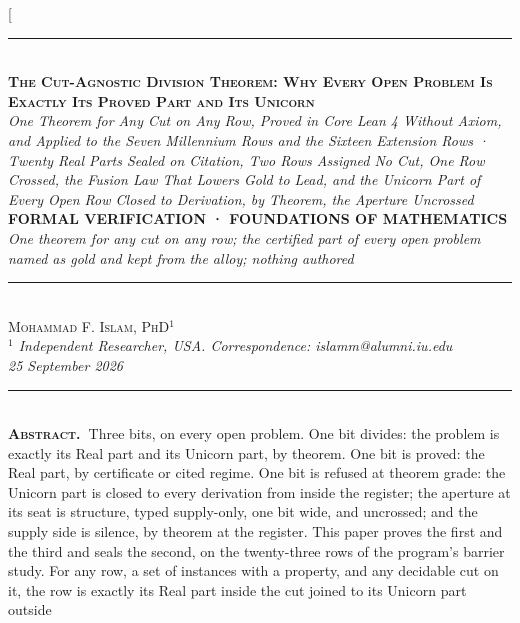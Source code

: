 \documentclass[10pt,twocolumn]{article}
\begin{document}
\twocolumn[{%
\begin{center}
{\color{accent}\rule{0.6\textwidth}{0.8pt}}\\[10pt]
{\bfseries\scshape\fontsize{20}{23}\selectfont The Cut-Agnostic Division
Theorem: Why Every Open Problem Is Exactly Its Proved Part and Its
Unicorn}\\[7pt]
{\itshape\large One Theorem for Any Cut on Any Row, Proved in Core Lean
4 Without Axiom, and Applied to the Seven Millennium Rows and the
Sixteen Extension Rows · Twenty Real Parts Sealed on Citation, Two Rows
Assigned No Cut, One Row Crossed, the Fusion Law That Lowers Gold to
Lead, and the Unicorn Part of Every Open Row Closed to Derivation, by
Theorem, the Aperture Uncrossed}\\[8pt]
{\footnotesize\color{accent}\scshape\bfseries FORMAL VERIFICATION ·
FOUNDATIONS OF MATHEMATICS}\\[3pt]
{\itshape\color{deep}\small One theorem for any cut on any row; the
certified part of every open problem named as gold and kept from the
alloy; nothing authored}\\[9pt]
{\color{accent}\rule{0.6\textwidth}{0.8pt}}\\[10pt]
{\scshape Mohammad F. Islam, PhD\(^{1}\)}\\[2pt]
{\itshape\color{faint}\small \(^{1}\) Independent Researcher, USA.
Correspondence: islamm@alumni.iu.edu}\\[2pt]
{\itshape\color{faint}\small 25 September 2026}\\[14pt]
\end{center}
\begin{minipage}{\textwidth}
{\color{accent}\rule{\textwidth}{0.6pt}}\\[4pt]
{\small\hspace{1em}\textbf{\scshape\color{deep}Abstract.\ }Three bits,
on every open problem. One bit divides: the problem is exactly its Real
part and its Unicorn part, by theorem. One bit is proved: the Real part,
by certificate or cited regime. One bit is refused at theorem grade: the
Unicorn part is closed to every derivation from inside the register; the
aperture at its seat is structure, typed supply-only, one bit wide, and
uncrossed; and the supply side is silence, by theorem at the register.
This paper proves the first and the third and seals the second, on the
twenty-three rows of the program's barrier study. For any row, a set of
instances with a property, and any decidable cut on it, the row is
exactly its Real part inside the cut joined to its Unicorn part outside
}
\end{minipage}}
\end{document}
